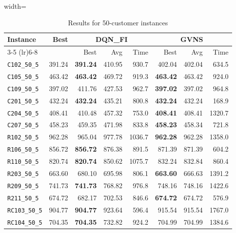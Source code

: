 \begin{table}[ht]
\centering
\small
\setlength{\tabcolsep}{5pt}
\caption{Results for 50-customer instances}
\vspace{4mm}
\begin{adjustbox}{width=\textwidth}
\begin{tabular}{l r r r r @{\hspace{8pt}} r r r @{\hspace{8pt}}}
\toprule
\multirow{2}{*}{Instance} & \multirow{2}{*}{Best} & \multicolumn{3}{c}{DQN\_FI} & \multicolumn{3}{c}{GVNS} \\
\cmidrule(lr){3-5} \cmidrule(lr){6-8}
 &  & Best & Avg & Time & Best & Avg & Time \\
\midrule
\texttt{C102\_50\_5} & 391.24 & \textbf{391.24} & 410.95 & 930.7 & 402.04 & 402.04 & 634.5 \\
\texttt{C105\_50\_5} & 463.42 & \textbf{463.42} & 469.72 & 919.3 & \textbf{463.42} & 463.42 & 924.0 \\
\texttt{C109\_50\_5} & 397.02 & 411.76 & 427.53 & 962.7 & \textbf{397.02} & 397.02 & 964.8 \\
\texttt{C201\_50\_5} & 432.24 & \textbf{432.24} & 435.21 & 800.8 & \textbf{432.24} & 432.24 & 168.9 \\
\texttt{C204\_50\_5} & 408.41 & 410.48 & 457.32 & 753.0 & \textbf{408.41} & 408.41 & 1320.7 \\
\texttt{C207\_50\_5} & 458.23 & 459.35 & 471.98 & 833.8 & \textbf{458.23} & 458.34 & 721.8 \\
\texttt{R102\_50\_5} & 962.28 & 965.04 & 977.78 & 1036.7 & \textbf{962.28} & 962.28 & 1358.0 \\
\texttt{R106\_50\_5} & 856.72 & \textbf{856.72} & 876.38 & 891.5 & 871.39 & 871.39 & 604.2 \\
\texttt{R110\_50\_5} & 820.74 & \textbf{820.74} & 850.62 & 1075.7 & 832.24 & 832.84 & 860.4 \\
\texttt{R203\_50\_5} & 663.60 & 680.10 & 695.98 & 806.1 & \textbf{663.60} & 666.63 & 1391.2 \\
\texttt{R209\_50\_5} & 741.73 & \textbf{741.73} & 768.82 & 976.8 & 748.16 & 748.16 & 1422.6 \\
\texttt{R211\_50\_5} & 674.72 & 682.17 & 702.53 & 846.6 & \textbf{674.72} & 674.72 & 576.9 \\
\texttt{RC103\_50\_5} & 904.77 & \textbf{904.77} & 923.64 & 596.4 & 915.54 & 915.54 & 1767.0 \\
\texttt{RC104\_50\_5} & 704.35 & \textbf{704.35} & 732.82 & 924.2 & 704.99 & 704.99 & 1384.6 \\

\end{tabular}
\end{adjustbox}
\end{table}
